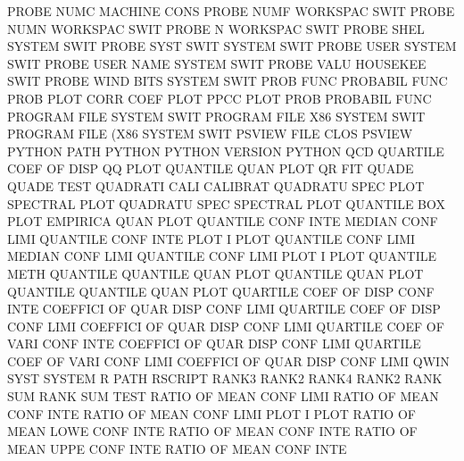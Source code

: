 PROBE    NUMC                           MACHINE  CONS
PROBE    NUMF                           WORKSPAC SWIT
PROBE    NUMN                           WORKSPAC SWIT
PROBE    N                              WORKSPAC SWIT
PROBE    SHEL                           SYSTEM   SWIT
PROBE    SYST SWIT                      SYSTEM   SWIT
PROBE    USER                           SYSTEM   SWIT
PROBE    USER NAME                      SYSTEM   SWIT
PROBE    VALU                           HOUSEKEE SWIT
PROBE    WIND BITS                      SYSTEM   SWIT
PROB     FUNC                           PROBABIL FUNC
PROB     PLOT CORR COEF PLOT            PPCC     PLOT
PROB                                    PROBABIL FUNC
PROGRAM  FILE                           SYSTEM   SWIT
PROGRAM  FILE X86                       SYSTEM   SWIT
PROGRAM  FILE (X86                      SYSTEM   SWIT
PSVIEW   FILE CLOS                      PSVIEW
PYTHON   PATH                           PYTHON
PYTHON   VERSION                        PYTHON
QCD                                     QUARTILE COEF OF   DISP
QQ       PLOT                           QUANTILE QUAN PLOT
QR                                      FIT
QUADE                                   QUADE    TEST
QUADRATI CALI                           CALIBRAT
QUADRATU SPEC PLOT                      SPECTRAL PLOT
QUADRATU SPEC                           SPECTRAL PLOT
QUANTILE BOX  PLOT                      EMPIRICA QUAN PLOT
QUANTILE CONF INTE                      MEDIAN   CONF LIMI
QUANTILE CONF INTE PLOT                 I        PLOT
QUANTILE CONF LIMI                      MEDIAN   CONF LIMI
QUANTILE CONF LIMI PLOT                 I        PLOT
QUANTILE METH                           QUANTILE
QUANTILE QUAN PLOT                      QUANTILE QUAN PLOT
QUANTILE                                QUANTILE QUAN PLOT
QUARTILE COEF OF   DISP CONF INTE       COEFFICI OF   QUAR DISP CONF LIMI
QUARTILE COEF OF   DISP CONF LIMI       COEFFICI OF   QUAR DISP CONF LIMI
QUARTILE COEF OF   VARI CONF INTE       COEFFICI OF   QUAR DISP CONF LIMI
QUARTILE COEF OF   VARI CONF LIMI       COEFFICI OF   QUAR DISP CONF LIMI
QWIN     SYST                           SYSTEM
R        PATH                           RSCRIPT
RANK3                                   RANK2
RANK4                                   RANK2
RANK     SUM                            RANK     SUM  TEST
RATIO    OF   MEAN CONF LIMI            RATIO    OF   MEAN CONF INTE
RATIO    OF   MEAN CONF LIMI PLOT       I        PLOT
RATIO    OF   MEAN LOWE CONF INTE       RATIO    OF   MEAN CONF INTE
RATIO    OF   MEAN UPPE CONF INTE       RATIO    OF   MEAN CONF INTE

